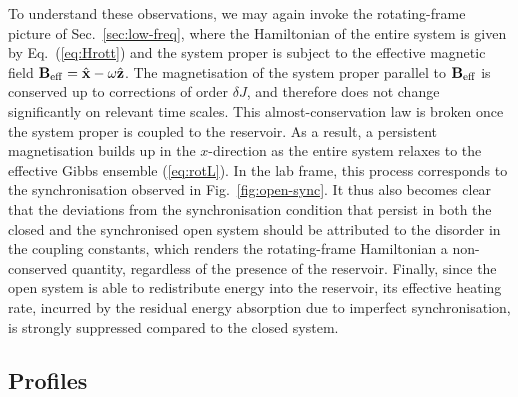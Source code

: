 \documentclass[aps,pre,twocolumn,notitlepage,floats,10pt]{revtex4-1}
\begin{document}
To understand these observations, we may again invoke the rotating-frame picture
of Sec.~\ref{sec:low-freq}, where the Hamiltonian of the entire system is given
by Eq.~(\ref{eq:Hrott}) and the system proper is subject to the effective magnetic
field ${\bf B}_{\rm eff} = \hat{\bf x} - \omega\hat{\bf z}$.
The magnetisation of the system proper parallel to ${\bf B}_{\rm eff}$ is
conserved up to corrections of order $\delta J$, and therefore does not change
significantly on relevant time scales.
This almost-conservation law is broken once the system proper is coupled to
the reservoir.
As a result, a persistent magnetisation builds up in the $x$-direction as the
entire system relaxes to the effective Gibbs ensemble (\ref{eq:rotL}).
In the lab frame, this process corresponds to the synchronisation observed in
Fig.~\ref{fig:open-sync}.
It thus also becomes clear that the deviations from the synchronisation
condition that persist in both the closed and the synchronised open system
should be attributed to the disorder in the coupling constants, which renders the
rotating-frame Hamiltonian a non-conserved quantity, regardless of the presence
of the reservoir.
Finally, since the open system is able to redistribute energy into the
reservoir, its effective heating rate, incurred by the residual energy
absorption due to imperfect synchronisation, is strongly suppressed compared to
the closed system.

\subsection{Profiles} \label{sec:prof}
\end{document}
